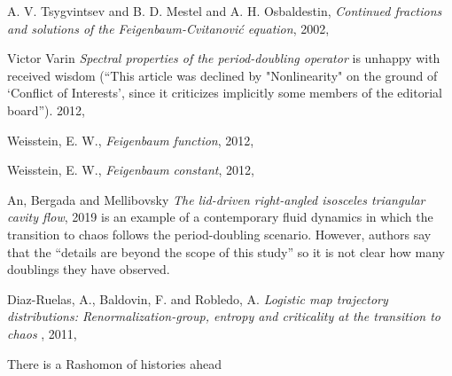 \begin{description}
{A. V. Tsygvintsev and B. D. Mestel and A. H. Osbaldestin},
{\em Continued fractions and solutions of the
{Feigenbaum-Cvitanovi{\'{c}}} equation},
{2002},

Victor Varin {\em Spectral properties of the period-doubling operator}
 is unhappy with received wisdom (``This article was
declined by "Nonlinearity" on the ground of `Conflict of Interests',
since it criticizes implicitly some members of the editorial board'').
{2012},

{Weisstein, E. W.},
{\em Feigenbaum function},
{2012},

{Weisstein, E. W.},
{\em Feigenbaum constant},
{2012},

{An, Bergada and Mellibovsky}
{\em The lid-driven right-angled isosceles triangular cavity flow},
{2019}
is an example of a contemporary fluid dynamics in which the transition to
chaos follows the period-doubling scenario. However, authors say that the
``details are beyond the scope of this study'' so it is not clear how
many doublings they have observed.

{Diaz-Ruelas, A., Baldovin, F. and Robledo, A.}
{\em Logistic map trajectory distributions: Renormalization-group,
entropy and criticality at the transition to chaos}
,
{2011},


\end{description}


There is a Rashomon of histories ahead

